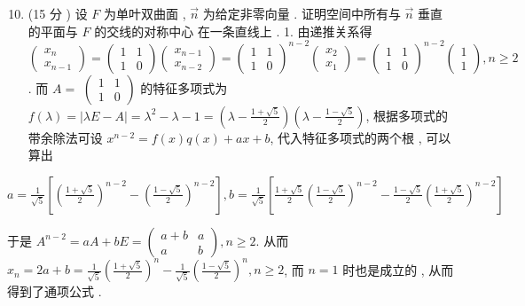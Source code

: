 \documentclass[10pt]{article}
\begin{document}
\begin{enumerate}
  \setcounter{enumi}{9}
  \item (15  分 )  设  $F$  为单叶双曲面 , $\vec{n}$  为给定非零向量 .  证明空间中所有与  $\vec{n}$  垂直的平面与  $F$  的交线的对称中心   在一条直线上 . 1.  由递推关系得  $\left(\begin{array}{c}x_{n} \\ x_{n-1}\end{array}\right)=\left(\begin{array}{ll}1 & 1 \\ 1 & 0\end{array}\right)\left(\begin{array}{l}x_{n-1} \\ x_{n-2}\end{array}\right)=\left(\begin{array}{ll}1 & 1 \\ 1 & 0\end{array}\right)^{n-2}\left(\begin{array}{l}x_{2} \\ x_{1}\end{array}\right)=\left(\begin{array}{ll}1 & 1 \\ 1 & 0\end{array}\right)^{n-2}\left(\begin{array}{l}1 \\ 1\end{array}\right), n \geq 2$.  而  $A=$ $\left(\begin{array}{ll}1 & 1 \\ 1 & 0\end{array}\right)$  的特征多项式为  $f(\lambda)=|\lambda E-A|=\lambda^{2}-\lambda-1=\left(\lambda-\frac{1+\sqrt{5}}{2}\right)\left(\lambda-\frac{1-\sqrt{5}}{2}\right)$,  根据多项式的   带余除法可设  $x^{n-2}=f(x) q(x)+a x+b$,  代入特征多项式的两个根 ,  可以算出 
\end{enumerate}
$a=\frac{1}{\sqrt{5}}\left[\left(\frac{1+\sqrt{5}}{2}\right)^{n-2}-\left(\frac{1-\sqrt{5}}{2}\right)^{n-2}\right], b=\frac{1}{\sqrt{5}}\left[\frac{1+\sqrt{5}}{2}\left(\frac{1-\sqrt{5}}{2}\right)^{n-2}-\frac{1-\sqrt{5}}{2}\left(\frac{1+\sqrt{5}}{2}\right)^{n-2}\right]$

 于是  $A^{n-2}=a A+b E=\left(\begin{array}{cc}a+b & a \\ a & b\end{array}\right), n \geq 2$.  从而  $x_{n}=2 a+b=\frac{1}{\sqrt{5}}\left(\frac{1+\sqrt{5}}{2}\right)^{n}-\frac{1}{\sqrt{5}}\left(\frac{1-\sqrt{5}}{2}\right)^{n}, n \geq 2$,  而  $n=1$  时也是成立的 ,  从而得到了通项公式 .
\end{document}
